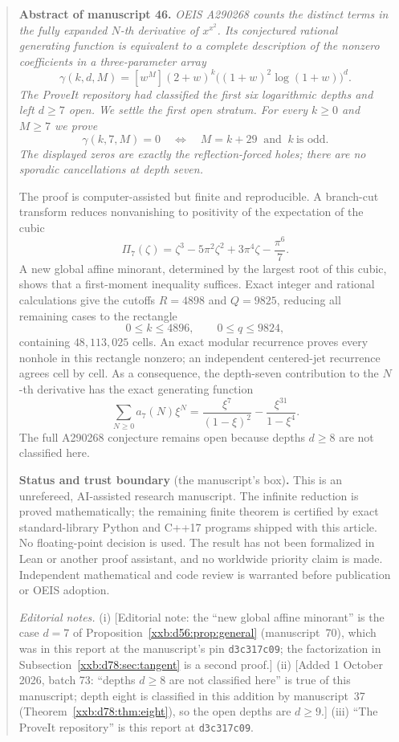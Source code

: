 \documentclass[11pt,a4paper]{article}
\numberwithin{equation}{section}
\theoremstyle{definition}
\theoremstyle{remark}
\theoremstyle{plain}
\begin{document}
\begin{quote}\small
\textbf{Abstract of manuscript 46.}\itshape
OEIS A290268 counts the distinct terms in the fully expanded $N$-th derivative
of $x^{x^2}$.  Its conjectured rational generating function is equivalent to a
complete description of the nonzero coefficients in a three-parameter array
\[
 \gamma(k,d,M)=[w^M](2+w)^k\bigl((1+w)^2\log(1+w)\bigr)^d.
\]
The ProveIt repository had classified the first six logarithmic depths and left
$d\geq7$ open.  We settle the first open stratum.  For every $k\geq0$ and
$M\geq7$ we prove
\[
 \gamma(k,7,M)=0
 \quad\Longleftrightarrow\quad
 M=k+29\ \text{ and }\ k\ \text{is odd}.
\]
The displayed zeros are exactly the reflection-forced holes; there are no
sporadic cancellations at depth seven.

The proof is computer-assisted but finite and reproducible.  A branch-cut
transform reduces nonvanishing to positivity of the expectation of the cubic
\[
 \Pi_7(\zeta)=\zeta^3-5\pi^2\zeta^2+3\pi^4\zeta-\frac{\pi^6}{7}.
\]
A new global affine minorant, determined by the largest root of this cubic,
shows that a first-moment inequality suffices.  Exact integer and rational
calculations give the cutoffs $R=4898$ and $Q=9825$, reducing all remaining
cases to the rectangle
\[
 0\leq k\leq4896,\qquad 0\leq q\leq9824,
\]
containing $48{,}113{,}025$ cells.  An exact modular recurrence proves every
nonhole in this rectangle nonzero; an independent centered-jet recurrence
agrees cell by cell.  As a consequence, the depth-seven contribution to the
$N$-th derivative has the exact generating function
\[
 \sum_{N\geq0} a_7(N)\xi^N
 =\frac{\xi^7}{(1-\xi)^2}-\frac{\xi^{31}}{1-\xi^4}.
\]
The full A290268 conjecture remains open because depths $d\geq8$ are not
classified here.
\upshape\par
\smallskip
\textbf{Status and trust boundary} (the manuscript's box)\textbf{.}
This is an unrefereed, AI-assisted research manuscript.  The infinite
reduction is proved mathematically; the remaining finite theorem is certified
by exact standard-library Python and C++17 programs shipped with this article.
No floating-point decision is used.  The result has not been formalized in
Lean or another proof assistant, and no worldwide priority claim is made.
Independent mathematical and code review is warranted before publication or
OEIS adoption.

\smallskip
\emph{Editorial notes.}  (i) [Editorial note: the ``new global affine
minorant'' is the case $d=7$ of Proposition~\ref{xxb:d56:prop:general}
(manuscript~70), which was in this report at the manuscript's pin
\texttt{d3c317c09}; the factorization in
Subsection~\ref{xxb:d78:sec:tangent} is a second proof.]
(ii) [Added 1 October 2026, batch 73: ``depths $d\ge8$ are not classified
here'' is true of this manuscript; depth eight is classified in this addition
by manuscript~37 (Theorem~\ref{xxb:d78:thm:eight}), so the open depths are
$d\ge9$.]  (iii) ``The ProveIt repository'' is this report at
\texttt{d3c317c09}.
\end{quote}
\end{document}
